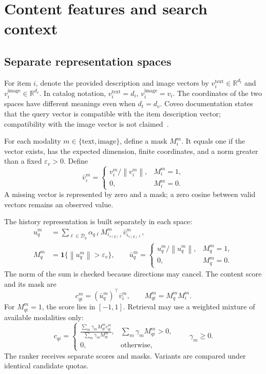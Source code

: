 \documentclass[12pt,a4paper]{article}
\newcommand{\R}{\mathbb R}
\newcommand{\ind}{\mathbf 1}
\newcommand{\eps}{\varepsilon}
\newcommand{\norm}[1]{\left\lVert#1\right\rVert}
\theoremstyle{plainru}
\begin{document}
\section{Content features and search context}\label{sec:model-content}

\subsection{Separate representation spaces}

For item $i$, denote the provided description and image vectors
by $v_i^{\mathrm{text}}\in\R^{d_t}$ and
$v_i^{\mathrm{image}}\in\R^{d_v}$.
In catalog notation, $v_i^{\mathrm{text}}=d_i$,
$v_i^{\mathrm{image}}=v_i$.
The coordinates of the two spaces have different meanings even when $d_t=d_v$.
Coveo documentation states that the query vector is compatible
with the item description vector; compatibility with the image vector
is not claimed~\cite{coveo-data}.

For each modality $m\in\{\mathrm{text},\mathrm{image}\}$,
define a mask $M_i^m$. It equals one if the vector exists,
has the expected dimension, finite coordinates, and a norm greater than
a fixed $\eps_v>0$. Define
\begin{equation}\label{eq:model-vector-normalization}
\bar v_i^m=
\begin{cases}
v_i^m/\norm{v_i^m},&M_i^m=1,\\
0,&M_i^m=0.
\end{cases}
\end{equation}
A missing vector is represented by zero and a mask; a zero cosine
between valid vectors remains an observed value.

The history representation is built separately in each space:
\begin{align}\label{eq:model-session-vector}
u_q^m&=\sum_{\ell\in\mathcal D_q}
\alpha_{q\ell}M^m_{i_{s(q)\ell}}\bar v^m_{i_{s(q)\ell}},\\
M_q^m&=\ind\{\norm{u_q^m}>\eps_v\},\qquad
\bar u_q^m=\begin{cases}u_q^m/\norm{u_q^m},&M_q^m=1,\\
0,&M_q^m=0.\end{cases}\nonumber
\end{align}
The norm of the sum is checked because directions may cancel.
The content score and its mask are
\begin{equation}\label{eq:model-content-score}
c^m_{qi}=(\bar u_q^m)^\top\bar v_i^m,\qquad
M^m_{qi}=M_q^m M_i^m.
\end{equation}
For $M^m_{qi}=1$, the score lies in $[-1,1]$.
Retrieval may use a weighted mixture of available modalities only:
\begin{equation}\label{eq:model-content-fusion}
c_{qi}=
\begin{cases}
\displaystyle\frac{\sum_m\gamma_m M^m_{qi}c^m_{qi}}
 {\sum_m\gamma_m M^m_{qi}},&\sum_m\gamma_m M^m_{qi}>0,\\[0.3em]
0,&\text{otherwise},
\end{cases}
\qquad \gamma_m\ge0.
\end{equation}
The ranker receives separate scores and masks.
Variants are compared under identical candidate quotas.
\end{document}
